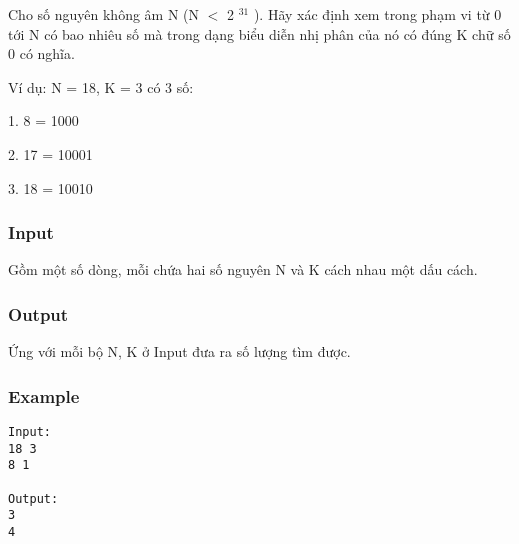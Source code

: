 



   Cho số nguyên không âm N (N $<$ 2   $^    31   $   ). Hãy xác định xem trong phạm vi từ 0 tới N có bao nhiêu số mà trong dạng biểu diễn nhị phân của nó có đúng K chữ số 0 có nghĩa.  

   Ví dụ: N = 18, K = 3 có 3 số:  

   1. 8 = 1000  

   2. 17 = 10001  

   3. 18 = 10010  

\subsubsection{   Input  }

   Gồm một số dòng, mỗi chứa hai số nguyên N và K cách nhau một dấu cách.  

\subsubsection{   Output  }

   Ứng với mỗi bộ N, K ở Input đưa ra số lượng tìm được.  

\subsubsection{   Example  }
\begin{verbatim}
Input:
18 3
8 1

Output:
3
4

\end{verbatim}